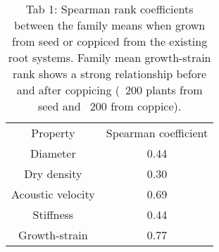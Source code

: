 \begin{table} 
    \begin{tabular}{ c c }
Property          & Spearman coefficient \\
Diameter          & 0.44                 \\
Dry density       & 0.30                 \\
Acoustic velocity & 0.69                 \\
Stiffness         & 0.44                 \\
Growth-strain     & 0.77  
    \end{tabular} 
    \caption{Tab 1: Spearman rank coefficients between the family means when grown from seed or coppiced from the existing root systems. Family mean growth-strain rank shows a strong relationship before and after coppicing (~200 plants from seed and ~200 from coppice). } 
\end{table}